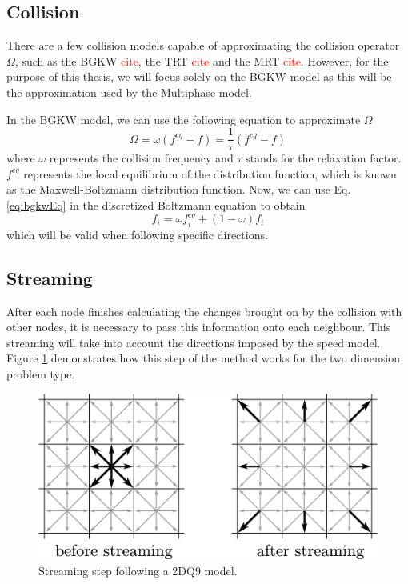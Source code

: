 \documentclass[12pt]{book}
\begin{document}
\subsection{Collision}
There are a few collision models capable of approximating the collision operator $\Omega$, such as the BGKW \textcolor{red}{cite}, the TRT \textcolor{red}{cite} and the MRT  \textcolor{red}{cite}. However, for the purpose of this thesis, we will focus solely on the BGKW model as this will be the approximation used by the Multiphase model. \par
In the BGKW model, we can use the following equation to approximate $\Omega$
\begin{equation}\label{eq:bgkwEq}
\Omega = \omega \left( f^{eq} - f\right) = \frac{1}{\tau}\left( f^{eq} - f\right)
\end{equation}
where $\omega$ represents the collision frequency and $\tau$ stands for the relaxation factor. $f^{eq}$ represents the local equilibrium of the distribution function, which is known as the Maxwell-Boltzmann distribution function. Now, we can use Eq. \ref{eq:bgkwEq} in the discretized Boltzmann equation to obtain
\begin{equation}
f_i = \omega f^{eq}_i + (1 - \omega)f_i%
\end{equation}
which will be valid when following specific directions.
\subsection{Streaming}\label{sec:streaming}
After each node finishes calculating the changes brought on by the collision with other nodes, it is necessary to pass this information onto each neighbour. This streaming will take into account the directions imposed by the speed model. Figure \ref{fig:streaming} demonstrates how this step of the method works for the two dimension problem type.

\begin{figure}[H]
	\centering
	\includegraphics[width=0.8\linewidth]{Resources/Images/streaming.png}
	\caption{Streaming step following a 2DQ9 model.}
	\label{fig:streaming}
\end{figure}
\end{document}
